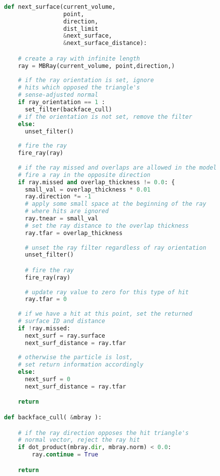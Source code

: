 \begin{lstlisting}[language=Python,basicstyle=\tiny,caption={Algorithm used in \textit{Next Surface} queries.},captionpos=b,label={alg:Next Surface Pseudo Code}]
  
  def next_surface(current_volume,
                   point,
                   direction,
                   dist_limit
                   &next_surface,
                   &next_surface_distance):

      # create a ray with infinite length
      ray = MBRay(current_volume, point,direction,)
    
      # if the ray orientation is set, ignore
      # hits which opposed the triangle's
      # sense-adjusted normal
      if ray_orientation == 1 :
        set_filter(backface_cull)
      # if the orientation is not set, remove the filter
      else:
        unset_filter()
    
      # fire the ray
      fire_ray(ray)
    
      # if the ray missed and overlaps are allowed in the model
      # fire a ray in the opposite direction
      if ray.missed and overlap_thickness != 0.0: {
        small_val = overlap_thickness * 0.01
        ray.direction *= -1
        # apply some small space at the beginning of the ray
        # where hits are ignored
        ray.tnear = small_val
        # set the ray distance to the overlap thickness
        ray.tfar = overlap_thickness
    
        # unset the ray filter regardless of ray orientation
        unset_filter()

        # fire the ray
        fire_ray(ray)
        
        # update ray value to zero for this type of hit
        ray.tfar = 0
    
      # if we have a hit at this point, set the returned
      # surface ID and distance
      if !ray.missed:
        next_surf = ray.surface
        next_surf_distance = ray.tfar
        
      # otherwise the particle is lost,
      # set return information accordingly
      else:
        next_surf = 0
        next_surf_distance = ray.tfar

      return

  def backface_cull( &mbray ):

      # if the ray direction opposes the hit triangle's
      # normal vector, reject the ray hit
      if dot_product(mbray.dir, mbray.norm) < 0.0:
          ray.continue = True

      return

\end{lstlisting}

